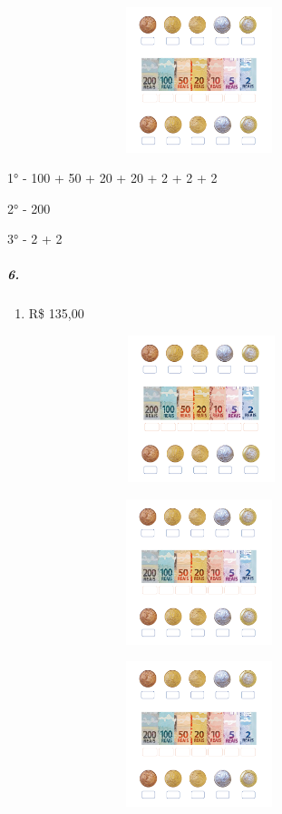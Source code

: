 \includegraphics[width=4.40625in,height=1.66152in]{media/image72.png}

1° - 100 + 50 + 20 + 20 + 2 + 2 + 2

2° - 200

3° - 2 + 2

\subparagraph{6.}\label{section-60}

\begin{enumerate}
\def\labelenumi{\alph{enumi})}
\item
  R\$ 135,00
\end{enumerate}

\includegraphics[width=4.45833in,height=1.68116in]{media/image72.png}

\includegraphics[width=4.40625in,height=1.66152in]{media/image72.png}

\includegraphics[width=4.40625in,height=1.66152in]{media/image72.png}

